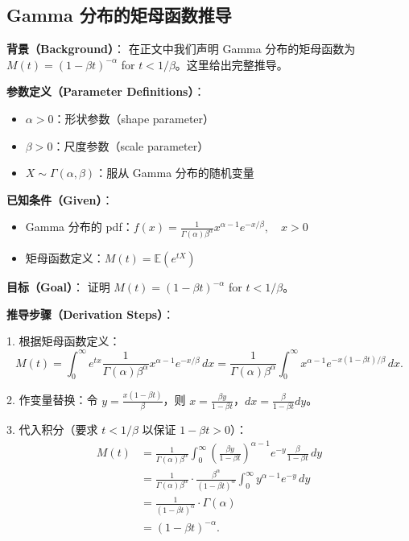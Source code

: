 \subsection{Gamma 分布的矩母函数推导}\label{sec:gamma-mgf-derivation}

\textbf{背景（Background）}：
在正文中我们声明 Gamma 分布的矩母函数为 $M(t) = (1 - \beta t)^{-\alpha}$ for $t < 1/\beta$。这里给出完整推导。

\textbf{参数定义（Parameter Definitions）}：
\begin{itemize}
\item $\alpha > 0$：形状参数（shape parameter）
\item $\beta > 0$：尺度参数（scale parameter）
\item $X \sim \Gamma(\alpha, \beta)$：服从 Gamma 分布的随机变量
\end{itemize}

\textbf{已知条件（Given）}：
\begin{itemize}
\item Gamma 分布的 pdf：$f(x) = \frac{1}{\Gamma(\alpha)\beta^{\alpha}} x^{\alpha-1} e^{-x/\beta}, \quad x > 0$
\item 矩母函数定义：$M(t) = \mathbb{E}(e^{tX})$
\end{itemize}

\textbf{目标（Goal）}：
证明 $M(t) = (1 - \beta t)^{-\alpha}$ for $t < 1/\beta$。

\textbf{推导步骤（Derivation Steps）}：

1. 根据矩母函数定义：
\[
M(t) = \int_{0}^{\infty} e^{tx} \frac{1}{\Gamma(\alpha)\beta^{\alpha}} x^{\alpha-1} e^{-x/\beta} \, dx
= \frac{1}{\Gamma(\alpha)\beta^{\alpha}} \int_{0}^{\infty} x^{\alpha-1} e^{-x(1 - \beta t)/\beta} \, dx.
\]

2. 作变量替换：令 $y = \frac{x(1 - \beta t)}{\beta}$，则 $x = \frac{\beta y}{1 - \beta t}$，$dx = \frac{\beta}{1 - \beta t} dy$。

3. 代入积分（要求 $t < 1/\beta$ 以保证 $1 - \beta t > 0$）：
\[
\begin{aligned}
M(t) &= \frac{1}{\Gamma(\alpha)\beta^{\alpha}} \int_{0}^{\infty} \left(\frac{\beta y}{1 - \beta t}\right)^{\alpha-1} e^{-y} \frac{\beta}{1 - \beta t} \, dy \\
&= \frac{1}{\Gamma(\alpha)\beta^{\alpha}} \cdot \frac{\beta^{\alpha}}{(1 - \beta t)^{\alpha}} \int_{0}^{\infty} y^{\alpha-1} e^{-y} \, dy \\
&= \frac{1}{(1 - \beta t)^{\alpha}} \cdot \Gamma(\alpha) \\
&= (1 - \beta t)^{-\alpha}.
\end{aligned}
\]

